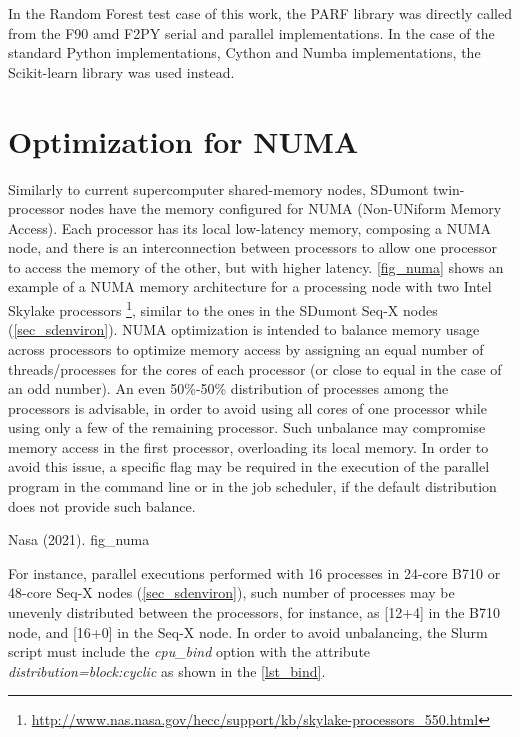 In the Random Forest test case of this work, the PARF library was directly called from the F90 amd F2PY serial and parallel implementations. In the case of the standard Python implementations, Cython and Numba implementations, the Scikit-learn library was used instead.  

%
%
%
\section{Optimization for NUMA}
\label{sec_opitnuma}

Similarly to current supercomputer shared-memory nodes, SDumont twin-processor nodes have the memory configured for NUMA (Non-UNiform Memory Access). Each processor has its local low-latency memory, composing a NUMA node, and there is an interconnection between processors to allow one processor to access the memory of the other, but with higher latency. \autoref {fig_numa} shows an example of a NUMA memory architecture for a processing node with two Intel Skylake processors \footnote{\url{http://www.nas.nasa.gov/hecc/support/kb/skylake-processors_550.html}}, similar to the ones in the SDumont Seq-X nodes (\autoref {sec_sdenviron}). NUMA optimization is intended to balance memory usage across processors to optimize memory access by assigning an equal number of threads/processes for the cores of each processor (or close to equal in the case of an odd number). An even 50\%-50\% distribution of processes among the processors is advisable, in order to avoid using all cores of one processor while using only a few of the remaining processor. Such unbalance may compromise memory access in the first processor, overloading its local memory. In order to avoid this issue, a specific flag may be required in the execution of the parallel program in the command line or in the job scheduler, if the default distribution does not provide such balance. 

     {Nasa (2021).} {fig_numa}

For instance, parallel executions performed with 16 processes in 24-core B710 or 48-core Seq-X nodes (\autoref {sec_sdenviron}), such number of processes may be unevenly distributed between the processors, for instance, as [12+4] in the B710 node, and [16+0] in the Seq-X node. In order to avoid unbalancing, the Slurm script must include the \textit {cpu\_bind} option with the attribute \textit {distribution=block:cyclic} as shown in the \autoref {lst_bind}.

